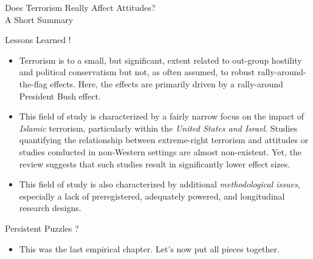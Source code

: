 
\vspace*{1mm}
\begin{flushright}
\Large{Does Terrorism Really Affect Attitudes? \\
A Short Summary}
\end{flushright} 

\vspace{1cm}
\normalsize

\begin{Box1}{Lessons Learned !}
\begin{itemize}[noitemsep]
\item Terrorism is to a small, but significant, extent related to out-group hostility and political conservatism but not, as often assumed, to robust rally-around-the-flag effects. Here, the effects are primarily driven by a rally-around President Bush effect.
\item This field of study is characterized by a fairly narrow focus on the impact of \textit{Islamic} terrorism, particularly within the \textit{United States and Israel}. Studies quantifying the relationship between extreme-right terrorism and attitudes or studies conducted in non-Western settings are almost non-existent. Yet, the review suggests that such studies result in significantly lower effect sizes.
\item This field of study is also characterized by additional \textit{methodological issues}, especially a lack of preregistered, adequately powered, and longitudinal research designs.
\end{itemize}
\end{Box1}

\vspace{1cm}

\begin{Box1}{Persistent Puzzles ?}
\begin{itemize}[noitemsep]
\item  This was the last empirical chapter. Let's now put all pieces together.
\end{itemize}
\end{Box1}
